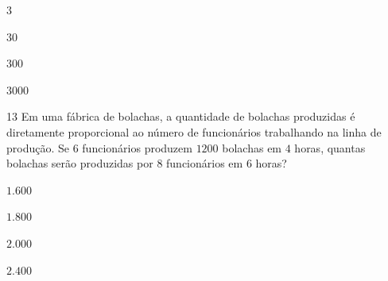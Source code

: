 \begin{escolha}
\item $3$
\item $30$
\item $300$
\item $3000$
\end{escolha}



\num{13} Em uma fábrica de bolachas, a quantidade de bolachas produzidas é
diretamente proporcional ao número de funcionários trabalhando na linha
de produção. Se $6$ funcionários produzem $1200$ bolachas em $4$ horas,
quantas bolachas serão produzidas por $8$ funcionários em $6$ horas?

\begin{escolha}
\item $1.600$ 
\item $1.800$ 
\item $2.000$ 
\item $2.400$
\end{escolha}


